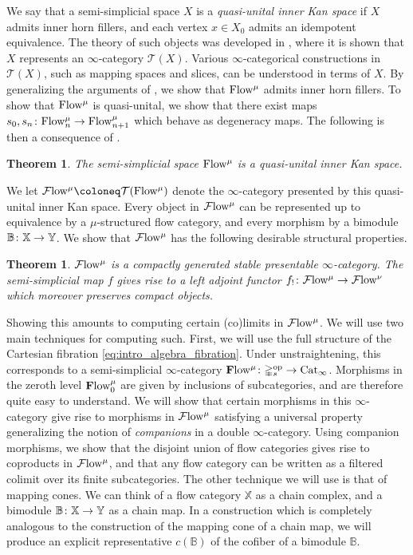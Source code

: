 \documentclass[10pt]{amsart}
\numberwithin{equation}{section}
\newtheorem{theorem}[prop]{Theorem}
\theoremstyle{definition}
\DeclareMathOperator{\op}{op}
\newcommand{\Flow}{\cF\mathrm{low}\vphantom{w}}
\newcommand{\bfFlow}{\mathbf{F}\mathrm{low}\vphantom{w}}
\newcommand{\PreFlow}{\mathrm{Flow}\vphantom{w}}
\newcommand{\Cat}{\mathrm{Cat}\vphantom{t}}
\newcommand{\bB}{\mathbb{B}}
\newcommand{\bX}{\mathbb{X}}
\newcommand{\bY}{\mathbb{Y}}
\newcommand{\Simp}{\mathbb{\Delta}}
\newcommand{\cF}{\mathcal{F}}
\newcommand{\cT}{\mathcal{T}}
\renewcommand{\to}{\mathchoice{\longrightarrow}{\rightarrow}{}{}}
\begin{document}
We say that a semi-simplicial space $X$ is a \emph{quasi-unital inner Kan space} if $X$ admits inner horn fillers, and each vertex $x\in X_{0}$ admits an idempotent equivalence.
The theory of such objects was developed in \cite{oldervoll2026quasi}, where it is shown that $X$ represents an $\infty$-category $\cT(X)$.
Various $\infty$-categorical constructions in $\cT(X)$, such as mapping spaces and slices, can be understood in terms of $X$.
By generalizing the arguments of \cite{AB}, we show that $\PreFlow^{\mu}$ admits inner horn fillers.
To show that $\PreFlow^{\mu}$ is quasi-unital, we show that there exist maps $s_{0},s_{n}\colon \PreFlow^{\mu}_{n} \to \PreFlow^{\mu}_{n+1}$ which behave as degeneracy maps.
The following is then a consequence of \cite[Theorem 1.2]{oldervoll2026quasi}.
\begin{theorem}\label{thm:Flow_is_quik}
	The semi-simplicial space $\PreFlow^{\mu}$ is a quasi-unital inner Kan space.
\end{theorem}
We let $\Flow^{\mu} \coloneq \cT(\PreFlow^{\mu})$ denote the $\infty$-category presented by this quasi-unital inner Kan space. Every object in $\Flow^{\mu}$ can be represented up to equivalence by a $\mu$-structured flow category, and every morphism by a bimodule $\bB\colon \bX\to \bY$. We show that $\Flow^{\mu}$ has the following desirable structural properties.
\begin{theorem}\label{thm:Flow_is_stable_pres}
	$\Flow^{\mu}$ is a compactly generated stable presentable $\infty$-category. The semi-simplicial map $f$ gives rise to a left adjoint functor $f_{!}\colon \Flow^{\mu}\to \Flow^{\nu}$ which moreover preserves compact objects.
\end{theorem}
Showing this amounts to computing certain (co)limits in $\Flow^{\mu}$.
We will use two main techniques for computing such. First, we will use the full structure of the Cartesian fibration \eqref{eq:intro_algebra_fibration}.
Under unstraightening, this corresponds to a semi-simplicial $\infty$-category $\bfFlow^{\mu}\colon \Simp_{s}^{\op} \to \Cat_{\infty}$.
Morphisms in the zeroth level $\bfFlow^{\mu}_{0}$ are given by inclusions of subcategories, and are therefore quite easy to understand.
We will show that certain morphisms in this $\infty$-category give rise to morphisms in $\Flow^{\mu}$ satisfying a universal property generalizing the notion of \emph{companions} in a double $\infty$-category.
Using companion morphisms, we show that the disjoint union of flow categories gives rise to coproducts in $\Flow^{\mu}$, and that any flow category can be written as a filtered colimit over its finite subcategories.
The other technique we will use is that of mapping cones.
We can think of a flow category $\bX$ as a chain complex, and a bimodule $\bB\colon \bX \to \bY$ as a chain map.
In a construction which is completely analogous to the construction of the mapping cone of a chain map, we will produce an explicit representative $c(\bB)$ of the cofiber of a bimodule $\bB$.
\end{document}
